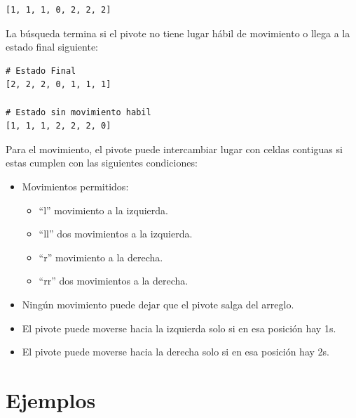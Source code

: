 \documentclass[letterpaper]{article}
\begin{document}
\begin{lstlisting}
[1, 1, 1, 0, 2, 2, 2]
\end{lstlisting}

La búsqueda termina si el pivote no tiene lugar hábil de movimiento o llega a la
estado final siguiente:

\begin{lstlisting}
# Estado Final
[2, 2, 2, 0, 1, 1, 1]

# Estado sin movimiento habil
[1, 1, 1, 2, 2, 2, 0]
\end{lstlisting}

Para el movimiento, el pivote puede intercambiar lugar con celdas contiguas si estas
cumplen con las siguientes condiciones:

\begin{itemize}
    \item Movimientos permitidos:
        \begin{itemize}
            \item ``l'' movimiento a la izquierda.
            \item ``ll'' dos movimientos a la izquierda.
            \item ``r'' movimiento a la derecha.
            \item ``rr'' dos movimientos a la derecha.
        \end{itemize}
    \item Ningún movimiento puede dejar que el pivote salga del arreglo.
    \item El pivote puede moverse hacia la izquierda solo si en esa posición hay 1s.
    \item El pivote puede moverse hacia la derecha solo si en esa posición hay 2s.
\end{itemize}

\section{Ejemplos}
\end{document}
